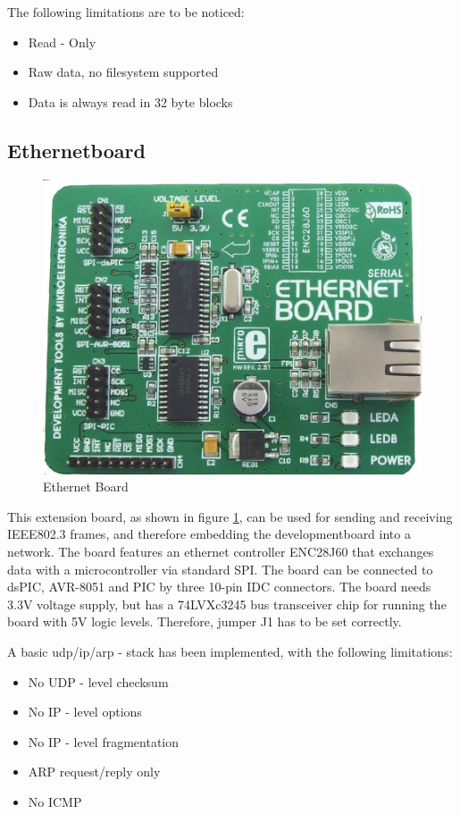 

The following limitations are to be noticed:

\begin{itemize}
 \item Read - Only
 \item Raw data, no filesystem supported
 \item Data is always read in 32 byte blocks
\end{itemize}

\subsection{Ethernetboard}


\begin{figure}[h]
 \centerline{\includegraphics[width=.5\columnwidth]{pics/Ethernetboard.png}}
  \caption{Ethernet Board}
  \label{fig:ethernetboard}
\end{figure}

This extension board, as shown in figure \ref{fig:ethernetboard}, can be used for sending and receiving IEEE802.3 frames, and therefore embedding the developmentboard into a network. The board features an ethernet controller ENC28J60 that exchanges data with a microcontroller via standard SPI. The board can be connected to dsPIC, AVR-8051 and PIC by three 10-pin IDC connectors. The board needs 3.3V voltage supply, but has a 74LVXc3245 bus transceiver chip for running the board with 5V logic levels. Therefore, jumper J1 has to be set correctly.

A basic udp/ip/arp - stack has been implemented, with the following limitations:

\begin{itemize}
 \item No UDP - level checksum
 \item No IP - level options
 \item No IP - level fragmentation
 \item ARP request/reply only
 \item No ICMP
\end{itemize}

